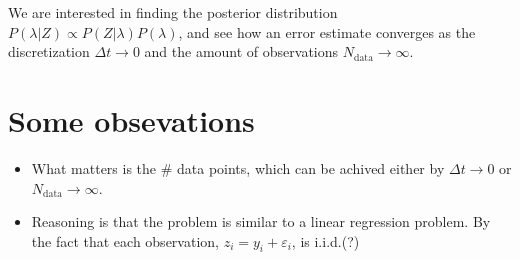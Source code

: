 \documentclass{amsart}
\numberwithin{equation}{section}
\numberwithin{table}{section}
\numberwithin{figure}{section}
\theoremstyle{plain}
\theoremstyle{definition}
\theoremstyle{remark}
\begin{document}
We are interested in finding the posterior distribution
$P(\lambda | Z) \propto P(Z | \lambda) P(\lambda)$, and see how an
error estimate converges as the discretization
$\Delta t \rightarrow 0$ and the amount of observations
$N_\text{data} \rightarrow \infty$.

\section{Some obsevations}
\begin{itemize}
\item What matters is the \# data points, which can be achived either
  by $\Delta t \rightarrow 0$ or $N_\text{data} \rightarrow \infty$.

\item Reasoning is that the problem is similar to a linear regression
  problem. By the fact that each observation,
  $z_i = y_i + \varepsilon_ i$, is i.i.d.(?)
\end{itemize}
\end{document}
